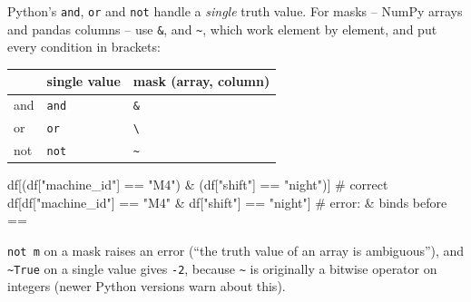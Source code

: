 \documentclass[
  letterpaper,
  DIV=11,
  numbers=noendperiod]{scrreprt}
\newenvironment{Shaded}{\begin{snugshade}}{\end{snugshade}}
\newcommand{\CommentTok}[1]{\textcolor[rgb]{0.37,0.37,0.37}{#1}}
\newcommand{\NormalTok}[1]{\textcolor[rgb]{0.00,0.23,0.31}{#1}}
\newcommand{\OperatorTok}[1]{\textcolor[rgb]{0.37,0.37,0.37}{#1}}
\newcommand{\StringTok}[1]{\textcolor[rgb]{0.13,0.47,0.30}{#1}}
\begin{document}
\begin{tcolorbox}[enhanced jigsaw, left=2mm, title=\textcolor{quarto-callout-warning-color}{\faExclamationTriangle}\hspace{0.5em}{Pitfall: \texttt{and}, \texttt{or}, \texttt{not} do not work on columns}, opacityback=0, breakable, rightrule=.15mm, arc=.35mm, toptitle=1mm, colbacktitle=quarto-callout-warning-color!10!white, opacitybacktitle=0.6, coltitle=black, colframe=quarto-callout-warning-color-frame, bottomrule=.15mm, leftrule=.75mm, bottomtitle=1mm, titlerule=0mm, toprule=.15mm, colback=white]

Python's \texttt{and}, \texttt{or} and \texttt{not} handle a
\emph{single} truth value. For masks -- NumPy arrays and pandas columns
-- use \texttt{\&}, \texttt{\textbar{}} and \texttt{\textasciitilde{}},
which work element by element, and put every condition in brackets:

\begin{longtable}[]{@{}lll@{}}
\toprule\noalign{}
& single value & mask (array, column) \\
\midrule\noalign{}
\endhead
\bottomrule\noalign{}
\endlastfoot
and & \texttt{and} & \texttt{\&} \\
or & \texttt{or} & \texttt{\textbackslash{}\textbar{}} \\
not & \texttt{not} & \texttt{\textasciitilde{}} \\
\end{longtable}

\begin{Shaded}
\begin{Highlighting}[]
\NormalTok{df[(df[}\StringTok{"machine\_id"}\NormalTok{] }\OperatorTok{==} \StringTok{"M4"}\NormalTok{) }\OperatorTok{\&}\NormalTok{ (df[}\StringTok{"shift"}\NormalTok{] }\OperatorTok{==} \StringTok{"night"}\NormalTok{)]   }\CommentTok{\# correct}
\NormalTok{df[df[}\StringTok{"machine\_id"}\NormalTok{] }\OperatorTok{==} \StringTok{"M4"} \OperatorTok{\&}\NormalTok{ df[}\StringTok{"shift"}\NormalTok{] }\OperatorTok{==} \StringTok{"night"}\NormalTok{]       }\CommentTok{\# error: \& binds before ==}
\end{Highlighting}
\end{Shaded}

\texttt{not\ m} on a mask raises an error (``the truth value of an array
is ambiguous''), and \texttt{\textasciitilde{}True} on a single value
gives \texttt{-2}, because \texttt{\textasciitilde{}} is originally a
bitwise operator on integers (newer Python versions warn about this).

\end{tcolorbox}
\end{document}
